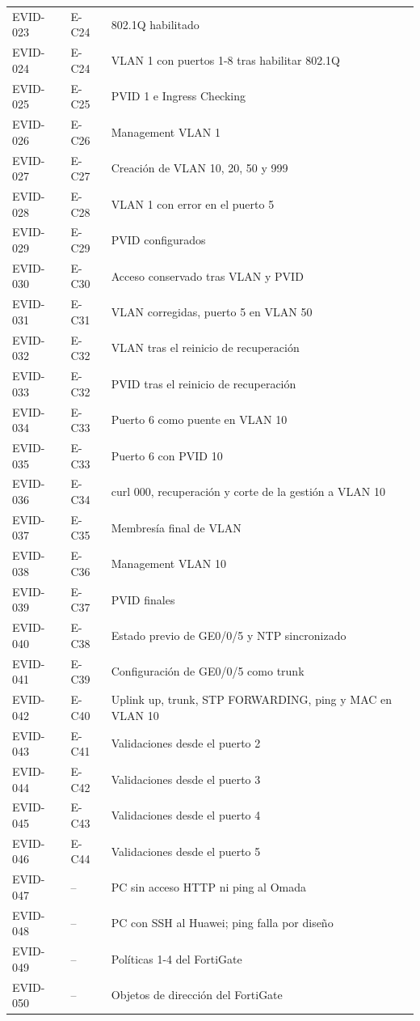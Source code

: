 \documentclass[11pt,a4paper]{article}
\begin{document}
{\begin{longtable}{L{1.6cm} L{1.8cm} L{11.9cm}}
  EVID-023 & E-C24 & 802.1Q habilitado\\
  EVID-024 & E-C24 & VLAN 1 con puertos 1-8 tras habilitar 802.1Q\\
  EVID-025 & E-C25 & PVID 1 e Ingress Checking\\
  EVID-026 & E-C26 & Management VLAN 1\\
  EVID-027 & E-C27 & Creación de VLAN 10, 20, 50 y 999\\
  EVID-028 & E-C28 & VLAN 1 con error en el puerto 5\\
  EVID-029 & E-C29 & PVID configurados\\
  EVID-030 & E-C30 & Acceso conservado tras VLAN y PVID\\
  EVID-031 & E-C31 & VLAN corregidas, puerto 5 en VLAN 50\\
  EVID-032 & E-C32 & VLAN tras el reinicio de recuperación\\
  EVID-033 & E-C32 & PVID tras el reinicio de recuperación\\
  EVID-034 & E-C33 & Puerto 6 como puente en VLAN 10\\
  EVID-035 & E-C33 & Puerto 6 con PVID 10\\
  EVID-036 & E-C34 & curl 000, recuperación y corte de la gestión a VLAN 10\\
  EVID-037 & E-C35 & Membresía final de VLAN\\
  EVID-038 & E-C36 & Management VLAN 10\\
  EVID-039 & E-C37 & PVID finales\\
  EVID-040 & E-C38 & Estado previo de GE0/0/5 y NTP sincronizado\\
  EVID-041 & E-C39 & Configuración de GE0/0/5 como trunk\\
  EVID-042 & E-C40 & Uplink up, trunk, STP FORWARDING, ping y MAC en VLAN 10\\
  EVID-043 & E-C41 & Validaciones desde el puerto 2\\
  EVID-044 & E-C42 & Validaciones desde el puerto 3\\
  EVID-045 & E-C43 & Validaciones desde el puerto 4\\
  EVID-046 & E-C44 & Validaciones desde el puerto 5\\
  EVID-047 & -- & PC sin acceso HTTP ni ping al Omada\\
  EVID-048 & -- & PC con SSH al Huawei; ping falla por diseño\\
  EVID-049 & -- & Políticas 1-4 del FortiGate\\
  EVID-050 & -- & Objetos de dirección del FortiGate\\

\end{longtable}}
\end{document}
